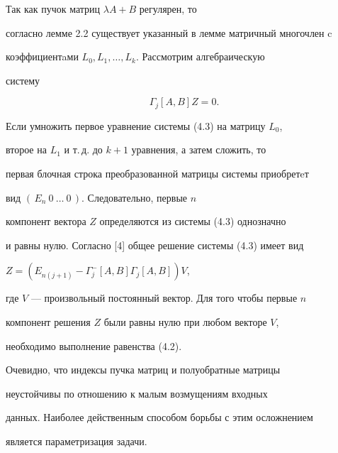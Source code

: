 \begin{pf}


Так как пучок матриц $\lambda A+B$ регулярен, то


согласно лемме 2.2 существует указанный в лемме матричный многочлен c


коэффициентaми $L_0, L_1, \dotsc, L_k$. Рассмотрим алгебраическую


систему


\begin{equation}


\Gamma _{j}[A,B]Z=0.


\end{equation}


Если умножить первое уравнение системы (4.3) на матрицу $L_0$,


второе на $L_1$ и т.\,д. до $k+1$ уравнения, а затем сложить, то


первая блочная строка преобразованной матрицы системы приобретeт


вид $(\, E_n \ 0 \ \dotsc \ 0 \,)$. Следовательно, первые $n$


компонент вектора $Z$ определяются из системы (4.3) однозначно


и равны нулю. Согласно [4] общее решение системы (4.3) имеет вид


$Z=(E_{n(j+1)}-\Gamma ^{-}_{j}[A,B]\Gamma _{j}[A,B])V$,


где $V$ --- произвольный постоянный вектор. Для того чтобы первые $n$


компонент решения $Z$ были равны нулю при любом векторе $V$,


необходимо выполнение равенства (4.2).


\end{pf}





Очевидно, что индексы пучка матриц и полуобратные матрицы


неустойчивы по отношению к малым возмущениям входных


данных. Наиболее действенным способом борьбы с этим осложнением


является параметризация задачи.





